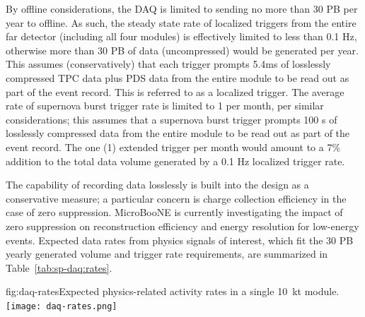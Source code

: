 By offline considerations, the DAQ is limited to sending no more than
30 PB per year to offline. As such, the steady state rate of localized triggers
from the entire far detector (including all four modules) is
effectively limited to less than 0.1 Hz, otherwise
more than 30 PB of data (uncompressed) would be generated per
year. This assumes (conservatively) that each
trigger prompts 5.4\si{\milli\second} of losslessly compressed TPC data plus PDS data from
the entire module to be read out as part of the event record. This is
referred to as a localized trigger. The average rate
of supernova burst trigger rate is limited to 1 per month, per similar
considerations; this assumes that a supernova burst trigger prompts 100 s of losslessly
compressed data from the entire module to be read out as part of the
event record. The one (1) extended trigger per month would amount to a
7\% addition to the total data volume generated by a 0.1 Hz localized
trigger rate.

The capability of recording data losslessly is built
into the design as a conservative measure; a particular concern is
charge collection efficiency in the case of zero
suppression. MicroBooNE is currently investigating the impact of zero
suppression on reconstruction efficiency and energy resolution for
low-energy events. Expected
data rates from physics signals of interest, which fit the 30 PB
yearly generated volume and
trigger rate requirements, are summarized in Table~\ref{tab:sp-daq:rates}.

\begin{dunefigure}{fig:daq-rates}{Expected physics-related activity
    rates in a single \SI{10}{\kilo\tonne} module. \label{sec:fd-daq:rates}
}
  \texttt{[image: daq-rates.png]}
\end{dunefigure}

